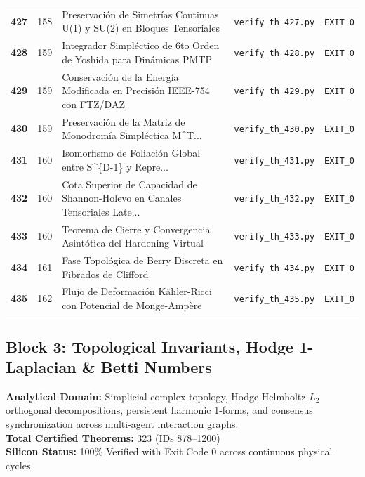 \documentclass[journal,10pt,compsoc]{IEEEtran}
\theoremstyle{plain}
\theoremstyle{definition}
\begin{document}
\begin{center}
\begin{longtable}{ccp{6.8cm}p{5.2cm}c}
\textbf{427} & 158 & Preservación de Simetrías Continuas U(1) y SU(2) en Bloques Tensoriales \label{thm:polydim_0427} & \texttt{verify\_th\_427.py} & \texttt{EXIT\_0} \\
\textbf{428} & 159 & Integrador Simpléctico de 6to Orden de Yoshida para Dinámicas PMTP \label{thm:polydim_0428} & \texttt{verify\_th\_428.py} & \texttt{EXIT\_0} \\
\textbf{429} & 159 & Conservación de la Energía Modificada en Precisión IEEE-754 con FTZ/DAZ \label{thm:polydim_0429} & \texttt{verify\_th\_429.py} & \texttt{EXIT\_0} \\
\textbf{430} & 159 & Preservación de la Matriz de Monodromía Simpléctica M\textasciicircum{}T... \label{thm:polydim_0430} & \texttt{verify\_th\_430.py} & \texttt{EXIT\_0} \\
\textbf{431} & 160 & Isomorfismo de Foliación Global entre S\textasciicircum{}\{D-1\} y Repre... \label{thm:polydim_0431} & \texttt{verify\_th\_431.py} & \texttt{EXIT\_0} \\
\textbf{432} & 160 & Cota Superior de Capacidad de Shannon-Holevo en Canales Tensoriales Late... \label{thm:polydim_0432} & \texttt{verify\_th\_432.py} & \texttt{EXIT\_0} \\
\textbf{433} & 160 & Teorema de Cierre y Convergencia Asintótica del Hardening Virtual \label{thm:polydim_0433} & \texttt{verify\_th\_433.py} & \texttt{EXIT\_0} \\
\textbf{434} & 161 & Fase Topológica de Berry Discreta en Fibrados de Clifford \label{thm:polydim_0434} & \texttt{verify\_th\_434.py} & \texttt{EXIT\_0} \\
\textbf{435} & 162 & Flujo de Deformación Kähler-Ricci con Potencial de Monge-Ampère \label{thm:polydim_0435} & \texttt{verify\_th\_435.py} & \texttt{EXIT\_0} \\
\bottomrule
\end{longtable}
\end{center}

\subsection{Block 3: Topological Invariants, Hodge 1-Laplacian & Betti Numbers}
\textbf{Analytical Domain:} Simplicial complex topology, Hodge-Helmholtz $L_2$ orthogonal decompositions, persistent harmonic 1-forms, and consensus synchronization across multi-agent interaction graphs.\\
\textbf{Total Certified Theorems:} 323 (IDs 878--1200)\\
\textbf{Silicon Status:} 100\% Verified with Exit Code 0 across continuous physical cycles.
\end{document}
